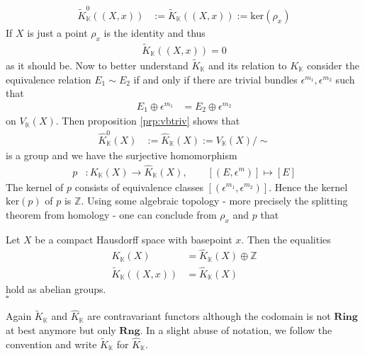 \begin{align*}
  \tilde{K}_{\mathbb{K}}^{0}((X,x))
  &:=
  \tilde{K}_{\mathbb{K}}((X,x))
  :=
  \mathrm{ker}(\rho_{x})
\end{align*}
If $X$ is just a point $\rho_{x}$ is the identity and thus
\begin{align*}
  \tilde{K}_{\mathbb{K}}((X,x))
  =
  0
\end{align*}
as it should be. Now to better understand $\tilde{K}_{\mathbb{K}}$ and its relation to $K_{\mathbb{K}}$ consider the equivalence relation $E_{1} \sim E_{2}$ if and only if there are trivial bundles $\epsilon^{m_{1}},\epsilon^{m_{2}}$ such that
\begin{align*}
  E_{1}
  \oplus
  \epsilon^{m_{1}}
  &=
  E_{2}
  \oplus
  \epsilon^{m_{2}}
\end{align*}
on $V_{\mathbb{K}}(X)$. Then proposition \ref{prp:vbtriv} shows that
\begin{align*}
  \hat{K}_{\mathbb{K}}^{0}(X)
  &:=
  \hat{K}_{\mathbb{K}}(X)
  :=
  V_{\mathbb{K}}(X)/\sim
\end{align*}
is a group and we have the surjective homomorphism
\begin{align*}
  p
  &\colon
  K_{\mathbb{K}}(X)
  \to
  \hat{K}_{\mathbb{K}}(X)
  ,\qquad
  [(E,\epsilon^{m})]
  \mapsto
  [E]
\end{align*}
The kernel of $p$ consists of equivalence classes $[(\epsilon^{m_{1}},\epsilon^{m_{2}})]$. Hence the kernel  $\mathrm{ker}(p)$ of $p$ is $\mathbb{Z}$. Using some algebraic topology - more precisely the splitting theorem from homology - one can conclude from $\rho_{x}$ and $p$ that
\\
\begin{prp}
\label{prp:factor}
Let $X$ be a compact Hausdorff space with basepoint $x$. Then the equalities
\begin{align*}
  K_{\mathbb{K}}(X)
  &=
  \hat{K}_{\mathbb{K}}(X) \oplus \mathbb{Z}
  \\
  \tilde{K}_{\mathbb{K}}((X,x))
  &= \hat{K}_{\mathbb{K}}(X)
\end{align*}
hold as abelian groups.
\\
\phantom{proven}
\hfill
$\square$
\end{prp}
Again $\tilde{K}_{\mathbb{K}}$ and $\hat{K}_{\mathbb{K}}$ are contravariant functors although the codomain is not $\mathbf{Ring}$ at best anymore but only $\mathbf{Rng}$. In a slight abuse of notation, we follow the convention and write $\tilde{K}_{\mathbb{K}}$ for $\hat{K}_{\mathbb{K}}$.
\\
